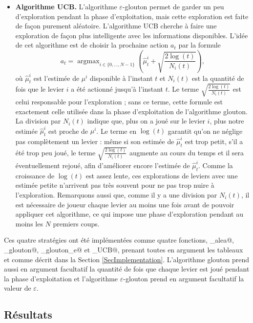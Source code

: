 \documentclass[a4paper,11pt]{article}
\DeclareMathOperator*{\argmax}{argmax}
\begin{document}
\begin{itemize}[label=\textbullet, leftmargin=*]
\item \textbf{Algorithme UCB.} L'algorithme $\varepsilon$-glouton permet de garder un peu d'exploration pendant la phase d'exploitation, mais cette exploration est faite de façon purement aléatoire. L'algorithme UCB cherche à faire une exploration de façon plus intelligente avec les informations disponibles. L'idée de cet algorithme est de choisir la prochaine action $a_t$ par la formule
\[a_t = \argmax_{i \in \{0, \dotsc, N-1\}} \left(\hat\mu_t^i + \sqrt{\frac{2 \log(t)}{N_i(t)}}\right),\]
où $\hat\mu_t^i$ est l'estimée de $\mu^i$ disponible à l'instant $t$ et $N_i(t)$ est la quantité de fois que le levier $i$ a été actionné jusqu'à l'instant $t$. Le terme $\sqrt{\frac{2 \log(t)}{N_i(t)}}$ est celui responsable pour l'exploration ; sans ce terme, cette formule est exactement celle utilisée dans la phase d'exploitation de l'algorithme glouton. La division par $N_i(t)$ indique que, plus on a joué sur le levier $i$, plus notre estimée $\hat\mu_t^i$ est proche de $\mu^i$. Le terme en $\log(t)$ garantit qu'on ne néglige pas complètement un levier : même si son estimée de $\hat\mu_t^i$ est trop petit, s'il a été trop peu joué, le terme $\sqrt{\frac{2 \log(t)}{N_i(t)}}$ augmente au cours du temps et il sera éventuellement rejoué, afin d'améliorer encore l'estimée de $\hat\mu_t^i$. Comme la croissance de $\log(t)$ est assez lente, ces explorations de leviers avec une estimée petite n'arrivent pas très souvent pour ne pas trop nuire à l'exploration. Remarquons aussi que, comme il y a une division par $N_i(t)$, il est nécessaire de joueur chaque levier au moins une fois avant de pouvoir appliquer cet algorithme, ce qui impose une phase d'exploration pendant au moins les $N$ premiers coups.
\end{itemize}

Ces quatre stratégies ont été implémentées comme quatre fonctions, \verb@algo_alea@, \verb@algo_glouton@, \verb@algo_glouton_e@ et \verb@algo_UCB@, prenant toutes en argument les tableaux \verb@mu@ et \verb@Na@ comme décrit dans la Section \ref{SecImplementation}. L'algorithme glouton prend aussi en argument facultatif la quantité de fois que chaque levier est joué pendant la phase d'exploitation et l'algorithme $\varepsilon$-glouton prend en argument facultatif la valeur de $\varepsilon$.

\subsection{Résultats}
\end{document}
